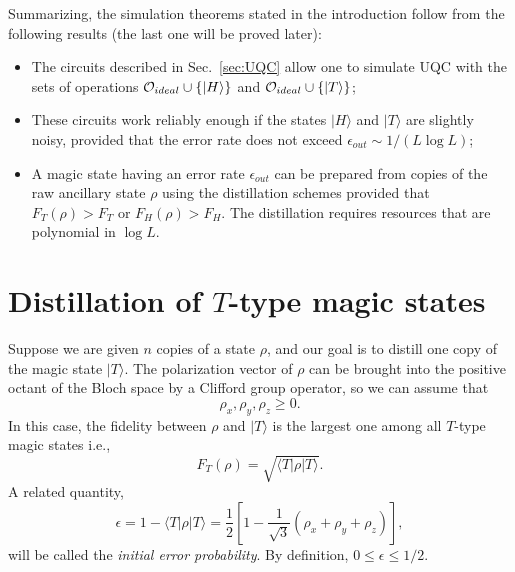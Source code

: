 \documentclass[pra,twocolumn,showpacs]{revtex4}
\newcommand{\calO}{{\cal O }}
\newcommand{\la}{\langle}
\newcommand{\ra}{\rangle}
\newcommand{\ep}{\epsilon}
\newcommand{\Tt}{$T$}
\begin{document}
Summarizing, the simulation theorems stated in the introduction 
follow from the following results (the last one will be proved later):
\begin{itemize}
\item
The circuits described in Sec.~\ref{sec:UQC}
allow one to simulate UQC with the sets of operations
$\calO_{ideal}\cup\{|H\rangle\}$ and $\calO_{ideal}\cup\{|T\rangle\}$;

\item 
These circuits work reliably enough if the states $|H\ra$ and $|T\ra$
are slightly noisy, provided  that the error rate does not exceed
$\ep_{out}\sim 1/(L\log{L})$;

\item
A magic state having an error rate $\ep_{out}$ can be prepared
from copies of the raw ancillary state $\rho$ 
using the distillation schemes 
provided that $F_T(\rho)>F_T$ or $F_H(\rho)>F_H$.
The distillation requires resources that are polynomial in $\log{L}$.

\end{itemize}
 

\section{\label{sec:T} Distillation of \Tt-type magic states}

Suppose we are given $n$ copies of a state $\rho$, and our goal is to
distill one copy of the magic state $|T\ra$.  The polarization vector of
$\rho$ can be brought into the positive octant of the Bloch space by a
Clifford group operator, so we can assume that
\[
\rho_x, \rho_y, \rho_z \ge 0.
\]
In this case, the fidelity between $\rho$ and $|T\ra$ is the
largest one among all \Tt-type magic states i.e.,
\[
F_T(\rho)=\sqrt{\la T|\rho| T\ra}.
\]
A related quantity,
\[
\ep = 1 - \la T|\rho| T\ra = \frac12 \left[ 1 - \frac1{\sqrt{3}} (
\rho_x + \rho_y + \rho_z )\right],
\]
will be called the {\it initial error probability}.
By definition, $0\le \ep\le 1/2$.
\end{document}
